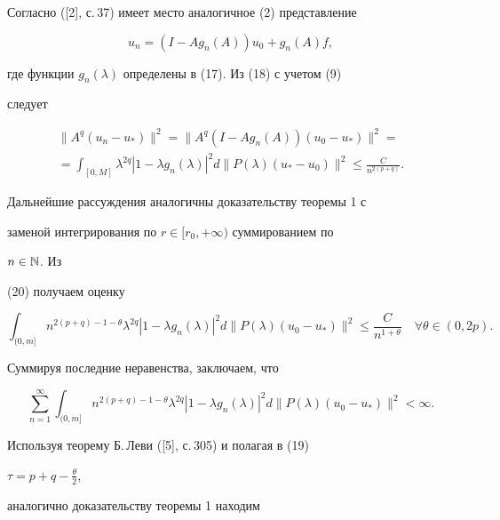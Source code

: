  


\begin{pf} 


Согласно ([2], с.\,37) имеет место аналогичное (2) представление 


$$ 


u_n=(I-A g_n(A))u_0+g_n(A)f, 


$$ 


где функции $g_n(\lambda)$ определены в (17). Из (18) с учетом (9) 


следует 


\begin{multline} 


\|A^q(u_n-u_*)\|^2=\|A^q(I-A g_n(A))(u_0-u_*)\|^2= \\


%


=\int_{[0,M]}\lambda^{2q}|1-\lambda g_n(\lambda)|^2 


d\|P(\lambda)(u_*-u_0)\|^2\le\frac{C}{n^{2(p+q)}}. 


\end{multline} 


Дальнейшие рассуждения аналогичны доказательству теоремы 1 с 


заменой интегрирования по $r\in[r_0,+\infty)$ суммированием по 


$n\in\Bbb N$. Из 


(20) получаем оценку 


$$ 


\int_{(0,m]}n^{2(p+q)-1-\theta}\lambda^{2q} 


|1-\lambda g_n(\lambda)|^2 


d\|P(\lambda)(u_0-u_*)\|^2\le\frac{C}{n^{1+\theta}} 


\quad \forall\theta\in(0,2p). 


$$ 


Суммируя последние неравенства, заключаем, что 


$$ 


\sum^\infty_{n=1}\int_{(0,m]} 


n^{2(p+q)-1-\theta}\lambda^{2q} 


|1-\lambda g_n(\lambda)|^2 


d\|P(\lambda)(u_0-u_*)\|^2<\infty. 


$$ 


Используя теорему Б.\,Леви ([5], с.\,305) и полагая в (19) 


$\tau=p+q-\frac{\theta}{2}$, 


аналогично доказательству теоремы 1 находим 



\end{pf}
